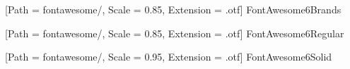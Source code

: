 \newfontfamily{\FABrands}
[Path = fontawesome/, 
Scale = 0.85, Extension = .otf]
{FontAwesome6Brands}

\newfontfamily{\FARegular}
[Path = fontawesome/, 
Scale = 0.85, Extension = .otf]
{FontAwesome6Regular}

\newfontfamily{\FASolid}
[Path = fontawesome/, 
Scale = 0.95, Extension = .otf]
{FontAwesome6Solid}

\newcommand{\faBrands}[1]{{\FABrands\symbol{"#1}}}
\newcommand{\faRegular}[1]{{\FARegular\symbol{"#1}}}
\newcommand{\faSolid}[1]{{\FASolid\symbol{"#1}}}


\def\faEnvelope{\faSolid{F0E0}}
\def\faEnvelopeO{\faRegular{F0E0}}
\def\faPhone{\faSolid{F095}}
\def\faGithub{\faBrands{F09B}}
\def\faGoogleScholar{\faBrands{E63B}}
\def\faOrcid{\faBrands{F8D2}}
\def\faCrossHairs{\faSolid{F05B}}
\def\faBullseye{\faSolid{F140}}

\def\faHeartbeat{\faSolid{F21E}}
\def\faGraduationCap{\faSolid{F19D}}
\def\faUniversity{\faSolid{F19C}}
\def\faUsers{\faSolid{F0C0}}
\def\faProject{\faSolid{F542}}
\def\faSquare{\faSolid{F0C8}}
\def\faCogs{\faSolid{F085}}
\def\faCog{\faSolid{F013}}
\def\faMusic{\faSolid{F001}}
\def\faPlay{\faSolid{F04B}}
\def\faFile{\faRegular{F15C}}
\def\faBook{\faSolid{F02D}}

\def\faMicrosoft{\faBrands{F3CA}}
\def\faApple{\faBrands{F179}}
\def\faGoogle{\faBrands{F1A0}}
\def\faMeta{\faBrands{E49B}}
\def\faFacebook{\faBrands{F09A}}
\def\faTwitter{\faBrands{F099}}
\def\faXTwitter{\faBrands{E61B}}
